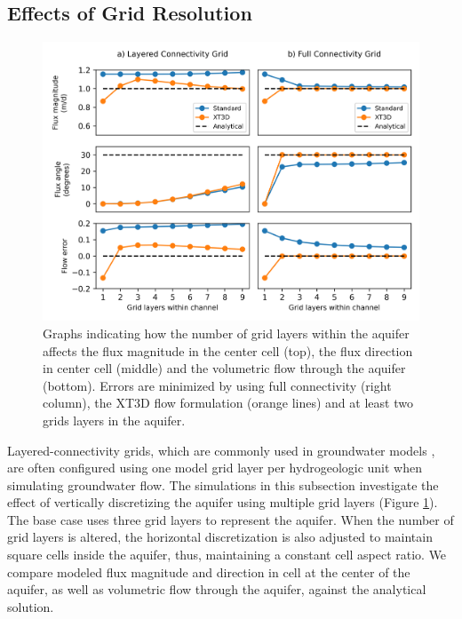 \documentclass{article}
\begin{document}
\subsection{Effects of Grid Resolution}

\begin{figure}
	\begin{center}
	\includegraphics[scale=0.9]{../figures/fig3paper.png}
	\caption{Graphs indicating how the number of grid layers within the aquifer affects the flux magnitude in the center cell (top), the flux direction in center cell (middle) and the volumetric flow through the aquifer (bottom). Errors are minimized by using full connectivity (right column), the XT3D flow formulation (orange lines) and at least two grids layers in the aquifer.}
	\label{fig:fig3}
	\end{center}
\end{figure}

Layered-connectivity grids, which are commonly used in groundwater models \citep{Reilly2004}, are often configured using one model grid layer per hydrogeologic unit when simulating groundwater flow. The simulations in this subsection investigate the effect of vertically discretizing the aquifer using multiple grid layers (Figure \ref{fig:fig3}). The base case uses three grid layers to represent the aquifer. When the number of grid layers is altered, the horizontal discretization is also adjusted to maintain square cells inside the aquifer, thus, maintaining a constant cell aspect ratio. We compare modeled flux magnitude and direction in cell at the center of the aquifer, as well as volumetric flow through the aquifer, against the analytical solution.
\end{document}
